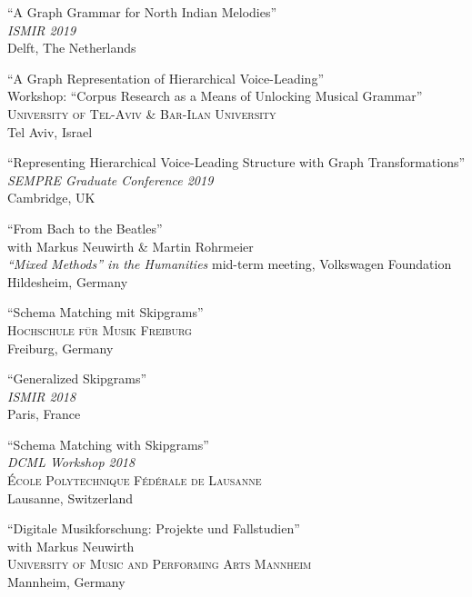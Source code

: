 \documentclass[10pt]{scrartcl}
\newcommand{\margintext}[1]{\marginpar{\raggedleft\itshape\small#1}}
\newcommand{\entry}[1]{\vphantom{x}\margintext{#1}}
\begin{document}
\entry{2019}%
\contrib \poster \enquote{A Graph Grammar for North Indian Melodies}
\\
\textit{ISMIR 2019}\\
Delft, The Netherlands

\invited \enquote{A Graph Representation of Hierarchical Voice-Leading}
\\
Workshop: \enquote{Corpus Research as a Means of Unlocking Musical Grammar}\\
\textsc{University of Tel-Aviv \& Bar-Ilan University}\\
Tel Aviv, Israel

\poster \enquote{Representing Hierarchical Voice-Leading Structure with Graph Transformations}\\
\textit{SEMPRE Graduate Conference 2019}\\
Cambridge, UK

\contrib \enquote{From Bach to the Beatles}
\\
with Markus Neuwirth \& Martin Rohrmeier\\
\textit{\enquote{Mixed Methods} in the Humanities} mid-term meeting, Volkswagen Foundation\\
Hildesheim, Germany

\invited \enquote{Schema Matching mit Skipgrams}
\\
\textsc{Hochschule für Musik Freiburg}\\
Freiburg, Germany

\entry{2018}%
\contrib \poster \enquote{Generalized Skipgrams}
\\
\textit{ISMIR 2018}\\
Paris, France

\invited \enquote{Schema Matching with Skipgrams}
\\
\textit{DCML Workshop 2018}\\
\textsc{École Polytechnique Fédérale de Lausanne}\\
Lausanne, Switzerland

\invited \enquote{Digitale Musikforschung: Projekte und Fallstudien}
\\
with Markus Neuwirth\\
\textsc{University of Music and Performing Arts Mannheim}\\
Mannheim, Germany
\end{document}
